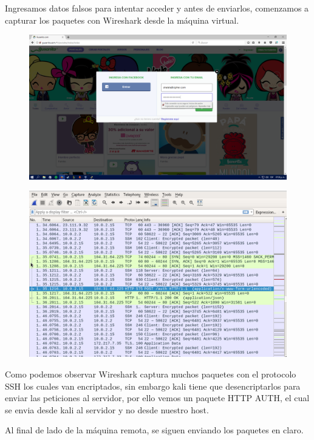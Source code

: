 \documentclass{article}
\begin{document}
Ingresamos datos falsos para intentar acceder y antes de enviarlos, comenzamos a capturar los paquetes con Wireshark desde la m\'aquina virtual.

\begin{figure}[H]
\centering
\includegraphics[width=1\textwidth]{15-CORREO}
\end{figure}

\begin{figure}[H]
\centering
\includegraphics[width=1\textwidth]{16-WIRESHARKHTTPAUTH}
\end{figure}
Como podemos observar Wireshark captura muchos paquetes con el protocolo SSH los cuales van encriptados, sin embargo kali tiene que desencriptarlos para enviar las peticiones al servidor, por ello vemos un paquete HTTP AUTH, el cual se envia desde kali al servidor y no desde nuestro host.

Al final de lado de la m\'aquina remota, se siguen enviando los paquetes en claro.
\end{document}
